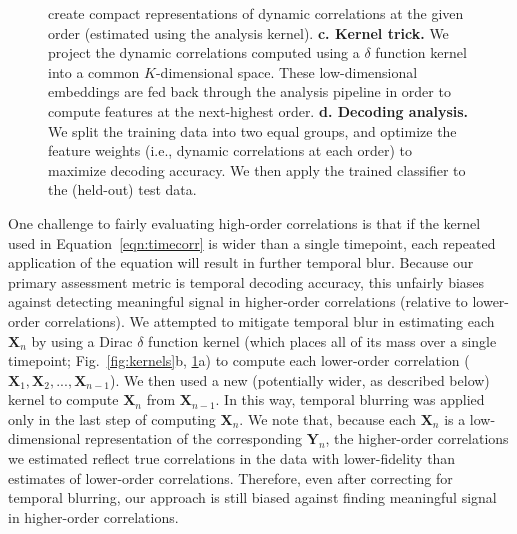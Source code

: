 \documentclass[english]{article}
\begin{document}
\begin{figure}[tp]
{    create compact representations of dynamic correlations at the
    given order (estimated using the analysis kernel).
   \textbf{c.  Kernel trick.}  We project the dynamic correlations
    computed using a $\delta$ function kernel into a common
    $K$-dimensional space.  These low-dimensional embeddings are fed
    back through the analysis pipeline in order to compute features at
    the next-highest order. \textbf{d. Decoding analysis.}  We split
    the training data into two equal groups, and optimize the feature
    weights (i.e., dynamic correlations at each order) to maximize
    decoding accuracy.  We then apply the trained classifier to the
    (held-out) test data.
  \label{fig:pipeline}}
\end{figure}


One challenge to fairly evaluating high-order correlations is that if
the kernel used in Equation~\ref{eqn:timecorr} is wider than a single
timepoint, each repeated application of the equation will result in
further temporal blur.  Because our primary assessment metric is
temporal decoding accuracy, this unfairly biases against detecting
meaningful signal in higher-order correlations (relative to
lower-order correlations).  We attempted to mitigate temporal blur in
estimating each $\mathbf{X}_n$ by using a Dirac $\delta$ function
kernel (which places all of its mass over a single timepoint;
Fig.~\ref{fig:kernels}b, \ref{fig:pipeline}a) to compute each lower-order correlation
($\mathbf{X}_1, \mathbf{X}_2, ..., \mathbf{X}_{n-1}$).  We then used a
new (potentially wider, as described below) kernel to compute
$\mathbf{X}_{n}$ from $\mathbf{X}_{n-1}$.  In this way, temporal
blurring was applied only in the last step of computing
$\mathbf{X}_n$.  We note that, because each $\mathbf{X}_n$ is a
low-dimensional representation of the corresponding $\mathbf{Y}_n$,
the higher-order correlations we estimated reflect true correlations
in the data with lower-fidelity than estimates of lower-order
correlations.  Therefore, even after correcting for temporal blurring,
our approach is still biased against finding meaningful signal in
higher-order correlations.
\end{document}
